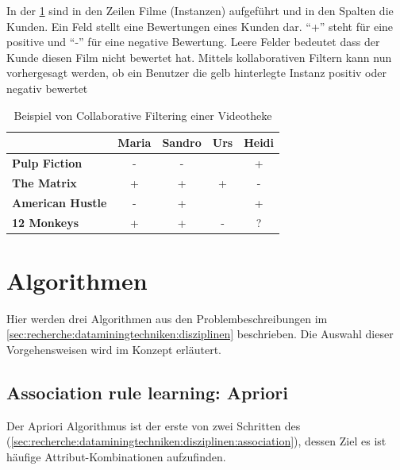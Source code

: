 In der \cref{fig:recherche:dataminingtechniken:disziplinen:collaborativefiltering} sind in den Zeilen Filme (Instanzen) aufgeführt und in den Spalten die Kunden. Ein Feld stellt eine Bewertungen eines Kunden dar. "`+"' steht für eine positive und "`-"' für eine negative Bewertung. Leere Felder bedeutet dass der Kunde diesen Film nicht bewertet hat. Mittels kollaborativen Filtern kann nun vorhergesagt werden, ob ein Benutzer die gelb hinterlegte Instanz positiv oder negativ bewertet 
\begin{table}[H] 
	\caption{Beispiel von Collaborative Filtering einer Videotheke}
	\centering
	\label{fig:recherche:dataminingtechniken:disziplinen:collaborativefiltering}
	
	\begin{tabular}{ | l | c | c | c | c |} 
		\hline 
		\rowcolor{tableheadcolor}
		\bfseries & 
		\bfseries Maria & 
		\bfseries Sandro & 
		\bfseries Urs & 
		\bfseries Heidi \\ \hline 
		\textbf{Pulp Fiction} & - & - &  & + \\ \hline 
		\textbf{The Matrix} & + & + & + & - \\ \hline 
		\textbf{American Hustle} & - & + &  & + \\ \hline 
		\textbf{12 Monkeys} & + & + & - & \cellcolor{yellow!75}? \\ \hline 
	\end{tabular} 
\end{table}

\section{Algorithmen}
\label{sec:recherche:algorithmen}
Hier werden drei Algorithmen aus den Problembeschreibungen im \cref{sec:recherche:dataminingtechniken:disziplinen}  beschrieben. Die Auswahl dieser Vorgehensweisen wird im Konzept erläutert.

\subsection{Association rule learning: Apriori}
\label{sec:recherche:apriori}
Der Apriori Algorithmus ist der erste von zwei Schritten des  (\cref{sec:recherche:dataminingtechniken:disziplinen:association}), dessen Ziel es ist häufige Attribut-Kombinationen aufzufinden. 

